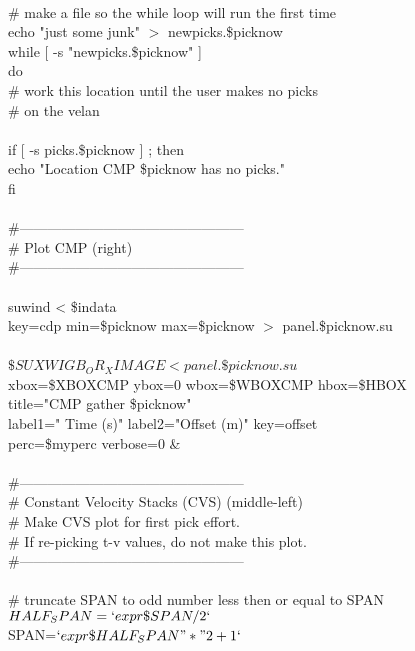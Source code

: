  \\
 \# make a file so the while loop will run the first time \\
 echo "just some junk" $>$ newpicks.\$picknow \\
 while [ -s "newpicks.\$picknow" ]  \\
 do \\
  \# work this location until the user makes no picks \\
  \# on the velan \\
   \\
  if [ -s picks.\$picknow ] ; then \\
    echo "Location CMP \$picknow has no picks." \\
  fi \\
 \\
  \#------------------------------------------------ \\
  \# Plot CMP (right) \\
  \#------------------------------------------------ \\
 \\
  suwind < \$indata \ \\
           key=cdp min=\$picknow max=\$picknow $>$ panel.\$picknow.su \\
 \\
 $ \$SUXWIGB_OR_XIMAGE < panel.\$picknow.su $ \ \\
      xbox=\$XBOXCMP ybox=0 wbox=\$WBOXCMP hbox=\$HBOX \ \\
      title="CMP gather \$picknow" \ \\
      label1=" Time (s)" label2="Offset (m)" key=offset \ \\
      perc=\$myperc verbose=0 \& \\
 \\
 \#------------------------------------------------ \\
 \# Constant Velocity Stacks (CVS) (middle-left) \\
 \# Make CVS plot for first pick effort. \\
 \# If re-picking t-v values, do not make this plot. \\
 \#------------------------------------------------ \\
 \\
  \# truncate SPAN to odd number less then or equal to SPAN \\
  $HALF_SPAN=`expr \$SPAN / 2`$ \\
  SPAN=$`expr \$HALF_SPAN "*" 2 + 1` $\\
